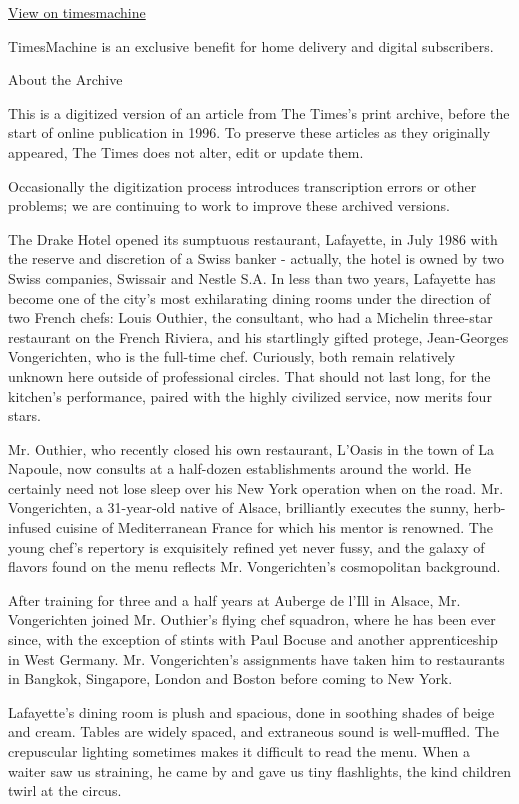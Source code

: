 \href{http://timesmachine.nytimes3xbfgragh.onion/timesmachine/1988/04/22/067888.html}{View
on timesmachine}

TimesMachine is an exclusive benefit for home delivery and digital
subscribers.

About the Archive

This is a digitized version of an article from The Times's print
archive, before the start of online publication in 1996. To preserve
these articles as they originally appeared, The Times does not alter,
edit or update them.

Occasionally the digitization process introduces transcription errors or
other problems; we are continuing to work to improve these archived
versions.

The Drake Hotel opened its sumptuous restaurant, Lafayette, in July 1986
with the reserve and discretion of a Swiss banker - actually, the hotel
is owned by two Swiss companies, Swissair and Nestle S.A. In less than
two years, Lafayette has become one of the city's most exhilarating
dining rooms under the direction of two French chefs: Louis Outhier, the
consultant, who had a Michelin three-star restaurant on the French
Riviera, and his startlingly gifted protege, Jean-Georges Vongerichten,
who is the full-time chef. Curiously, both remain relatively unknown
here outside of professional circles. That should not last long, for the
kitchen's performance, paired with the highly civilized service, now
merits four stars.

Mr. Outhier, who recently closed his own restaurant, L'Oasis in the town
of La Napoule, now consults at a half-dozen establishments around the
world. He certainly need not lose sleep over his New York operation when
on the road. Mr. Vongerichten, a 31-year-old native of Alsace,
brilliantly executes the sunny, herb-infused cuisine of Mediterranean
France for which his mentor is renowned. The young chef's repertory is
exquisitely refined yet never fussy, and the galaxy of flavors found on
the menu reflects Mr. Vongerichten's cosmopolitan background.

After training for three and a half years at Auberge de l'Ill in Alsace,
Mr. Vongerichten joined Mr. Outhier's flying chef squadron, where he has
been ever since, with the exception of stints with Paul Bocuse and
another apprenticeship in West Germany. Mr. Vongerichten's assignments
have taken him to restaurants in Bangkok, Singapore, London and Boston
before coming to New York.

Lafayette's dining room is plush and spacious, done in soothing shades
of beige and cream. Tables are widely spaced, and extraneous sound is
well-muffled. The crepuscular lighting sometimes makes it difficult to
read the menu. When a waiter saw us straining, he came by and gave us
tiny flashlights, the kind children twirl at the circus.

